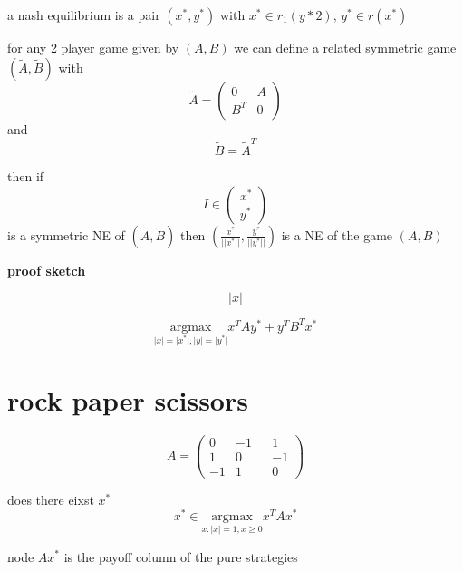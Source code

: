 \documentclass{article}
\theoremstyle{definition}
\newcommand{\norm}[1]{\lvert #1 \rvert}
\begin{document}
a nash equilibrium is a pair \((x^*,y^*)\) with \(x^*\in r_1(y*2)\), \(y^*\in r(x^*)\)


for any 2 player game given by \((A,B)\) we can define a related symmetric game \((\tilde A,\tilde B)\) with \begin{equation}
    \tilde A = \begin{pmatrix}
        0&A\\
        B^T&0
    \end{pmatrix}
\end{equation}
and \begin{equation}
    \tilde B = \tilde A^T
\end{equation}

then if \begin{equation}
    I\in \begin{pmatrix}
    x^*\\
    y^*
    \end{pmatrix}
\end{equation}  is a symmetric NE of \((\tilde A,\tilde B)\) then \(\left(\frac{x^*}{\vert\vert x^*\vert \vert},\frac{y^*}{\vert\vert y^*\vert \vert}\right)\)
is a NE of the game \((A,B)\)

\textbf{proof sketch}

\begin{equation}
    \lvert x\rvert
\end{equation}

\begin{equation}
    \underset{\norm{x} = \norm{x^*},\norm{y} = \norm{y^*}}{\text{argmax} }x^TAy^* + y^TB^T x^*
\end{equation}

\section{rock paper scissors}

\begin{equation}
    A=\begin{pmatrix}
        0&-1&&1\\
        1&0&&-1\\
        -1&1&&0
    \end{pmatrix}
\end{equation}

does there eixst \(x^*\)
\begin{equation}
    x^*\in \underset{x:\norm x=1, x\geq0}{\text{argmax}}x^TAx^*
\end{equation}


node \(Ax^*\) is the payoff column of the pure strategies
\end{document}
